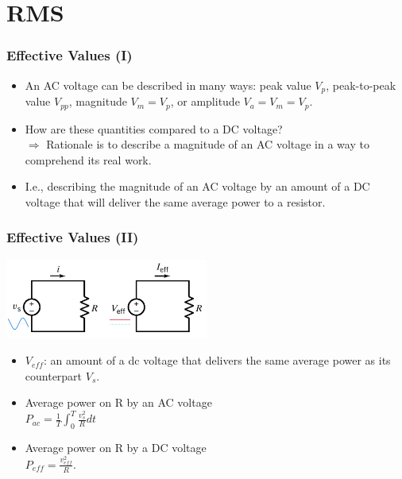 \documentclass{beamer}
\begin{document}

\section{RMS}

\begin{frame}[fragile]
\frametitle{Effective Values (I)}

\begin{itemize}
\item An AC voltage can be described in many ways: peak value $V_p$, peak-to-peak value $V_{pp}$, magnitude $V_m = V_p$, or amplitude $V_a = V_m = V_p$.
\item How are these quantities compared to a DC voltage?
\\
$\Rightarrow$ Rationale is to describe a magnitude of an AC voltage in a way to comprehend its real work.
\item I.e., describing the magnitude of an AC voltage by an amount of a DC voltage that will deliver the same average power to a resistor.
\end{itemize}

\end{frame}


\begin{frame}[fragile]
\frametitle{Effective Values (II)}

\vspace{-1cm}

%
%
\begin{center}
\includegraphics[width=0.5\textwidth]{src/effective.png}
\end{center}

\vspace{-0.5cm}

\begin{itemize}
\item $V_{eff}$: an amount of a dc voltage that delivers the same average power as its counterpart $V_s$.
\item Average power on R by an AC voltage
\\
$P_{ac} = \frac{1}{T} \int_0^T \frac{v_s^2}{R} dt$
\item Average power on R by a DC voltage
\\
$P_{eff} = \frac{v_{eff}^2}{R}$.
\end{itemize}

\end{frame}
\end{document}

